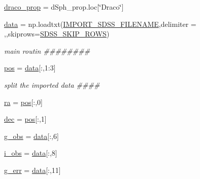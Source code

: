 \begin{DoxyCompactItemize}
\item 
\hyperlink{namespaceplot__Draco__SDSS__CMD__CMcut_a22c5b1763acfcb31495a03f63f3c6182}{draco\+\_\+prop} = d\+Sph\+\_\+prop.\+loc\mbox{[}\char`\"{}Draco\char`\"{}\mbox{]}
\item 
\hyperlink{namespaceplot__Draco__SDSS__CMD__CMcut_a06b020e30f5517df354b6f8db8d1e22d}{data} = np.\+loadtxt(\hyperlink{namespaceplot__Draco__SDSS__CMD__CMcut_a831c14a92a01b5c37b46393599122c71}{I\+M\+P\+O\+R\+T\+\_\+\+S\+D\+S\+S\+\_\+\+F\+I\+L\+E\+N\+A\+ME},delimiter = \textquotesingle{},\textquotesingle{},skiprows=\hyperlink{namespaceplot__Draco__SDSS__CMD__CMcut_a77aba141d44a10aa841629c09bb35e86}{S\+D\+S\+S\+\_\+\+S\+K\+I\+P\+\_\+\+R\+O\+WS})
\begin{DoxyCompactList}\small\item\em main routin \#\#\#\#\#\#\#\# \end{DoxyCompactList}\item 
\hyperlink{namespaceplot__Draco__SDSS__CMD__CMcut_a455b43c2b64fee5163e0a175c6313229}{pos} = \hyperlink{namespaceplot__Draco__SDSS__CMD__CMcut_a06b020e30f5517df354b6f8db8d1e22d}{data}\mbox{[}\+:,1\+:3\mbox{]}
\begin{DoxyCompactList}\small\item\em split the imported data \#\#\#\# \end{DoxyCompactList}\item 
\hyperlink{namespaceplot__Draco__SDSS__CMD__CMcut_a1d4f3338e366e359d28b436e627317ad}{ra} = \hyperlink{namespaceplot__Draco__SDSS__CMD__CMcut_a455b43c2b64fee5163e0a175c6313229}{pos}\mbox{[}\+:,0\mbox{]}
\item 
\hyperlink{namespaceplot__Draco__SDSS__CMD__CMcut_ac51d42ccd172a5b9e65f9c86aa8db55d}{dec} = \hyperlink{namespaceplot__Draco__SDSS__CMD__CMcut_a455b43c2b64fee5163e0a175c6313229}{pos}\mbox{[}\+:,1\mbox{]}
\item 
\hyperlink{namespaceplot__Draco__SDSS__CMD__CMcut_a7ddace395c7e32e514f063339a1d614f}{g\+\_\+obs} = \hyperlink{namespaceplot__Draco__SDSS__CMD__CMcut_a06b020e30f5517df354b6f8db8d1e22d}{data}\mbox{[}\+:,6\mbox{]}
\item 
\hyperlink{namespaceplot__Draco__SDSS__CMD__CMcut_a98d3e4d508df5a26d2951e5b5e18eb70}{i\+\_\+obs} = \hyperlink{namespaceplot__Draco__SDSS__CMD__CMcut_a06b020e30f5517df354b6f8db8d1e22d}{data}\mbox{[}\+:,8\mbox{]}
\item 
\hyperlink{namespaceplot__Draco__SDSS__CMD__CMcut_ae75c0a2a713511a7807baa4ca817e5be}{g\+\_\+err} = \hyperlink{namespaceplot__Draco__SDSS__CMD__CMcut_a06b020e30f5517df354b6f8db8d1e22d}{data}\mbox{[}\+:,11\mbox{]}

\end{DoxyCompactItemize}
